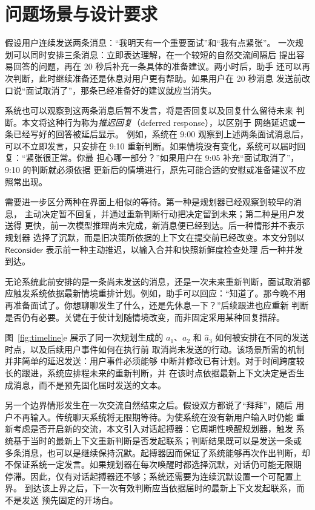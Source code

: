 \documentclass[manuscript,nonacm]{acmart}
\begin{document}
\section{问题场景与设计要求}

假设用户连续发送两条消息：“我明天有一个重要面试”和“我有点紧张”。
一次规划可以同时安排三条消息：立即表达理解，在一个较短的自然交流间隔后
提出容易回答的问题，再在 20 秒后补充一条具体的准备建议。两小时后，助手
还可以再次判断，此时继续准备还是休息对用户更有帮助。如果用户在 20 秒消息
发送前改口说“面试取消了”，那条已经准备好的建议就应当消失。

系统也可以观察到这两条消息后暂不发言，将是否回复以及回复什么留待未来
判断。本文将这种行为称为\emph{推迟回复}（deferred response），以区别于
网络延迟或一条已经写好的回答被延后显示。
例如，系统在 9:00 观察到上述两条面试消息后，可以不立即发言，只安排在
9:10 重新判断。如果情境没有变化，系统可以届时回复：“紧张很正常。你最
担心哪一部分？”如果用户在 9:05 补充“面试取消了”，9:10 的判断就必须依据
更新后的情境进行，原先可能合适的安慰或准备建议不应照常出现。

需要进一步区分两种在界面上相似的等待。第一种是规划器已经观察到较早的消息，
主动决定暂不回复，并通过重新判断行动把决定留到未来；第二种是用户发送得
更快，前一次模型推理尚未完成，新消息便已经到达。后一种情形并不表示规划器
选择了沉默，而是旧决策所依据的上下文在提交前已经改变。本文分别以
$\mathsf{Reconsider}$ 表示前一种主动推迟，以输入合并和快照新鲜度检查处理
后一种并发到达。

无论系统此前安排的是一条尚未发送的消息，还是一次未来重新判断，面试取消都
应触发系统依据最新情境重排计划。例如，助手可以回应：“知道了。那今晚不用
再准备面试了。你想聊聊发生了什么，还是先休息一下？”后续跟进也应重新
判断是否仍有必要。关键在于使计划随情境改变，而非固定采用某种回复措辞。

图~\ref{fig:timeline}e 展示了同一次规划生成的 $a_1$、$a_2$ 和
$\widehat{a}_3$ 如何被安排在不同的发送时点，以及后续用户事件如何在执行前
取消尚未发送的行动。该场景所需的机制并非简单的延迟发送：用户事件必须能够
中断并修改已有计划。对于时间跨度较长的跟进，系统应排程未来的重新判断，并
在该时点依据最新上下文决定是否生成消息，而不是预先固化届时发送的文本。

另一个边界情形发生在一次交流自然结束之后。假设双方都说了“拜拜”，随后
用户不再输入。传统聊天系统将无限期等待。为使系统在没有新用户输入时仍能
重新考虑是否开启新的交流，本文引入对话起搏器：它周期性唤醒规划器，触发
系统基于当时的最新上下文重新判断是否发起联系；判断结果既可以是发送一条或
多条消息，也可以是继续保持沉默。起搏器因而保证了系统能够再次作出判断，却
不保证系统一定发言。如果规划器在每次唤醒时都选择沉默，对话仍可能无限期
停滞。因此，仅有对话起搏器还不够；系统还需要为连续沉默设置一个可配置上界。
到达该上界之后，下一次有效判断应当依据届时的最新上下文发起联系，而不是发送
预先固定的开场白。
\end{document}
